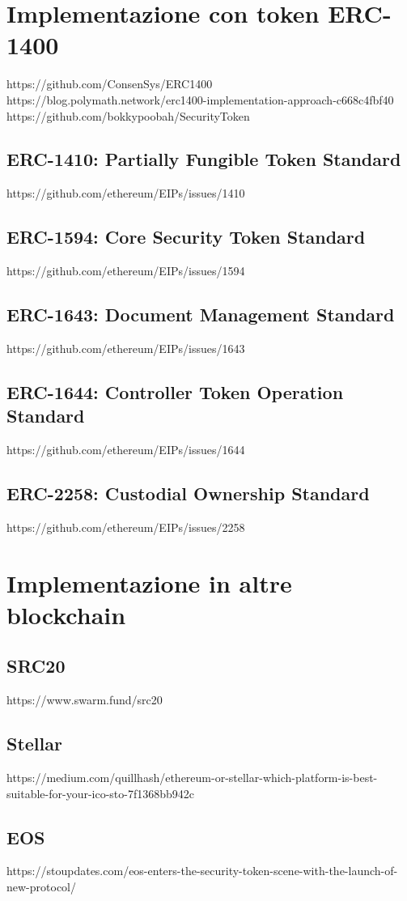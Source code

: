 \section{Implementazione con token ERC-1400}
https://github.com/ConsenSys/ERC1400
https://blog.polymath.network/erc1400-implementation-approach-c668c4fbf40
https://github.com/bokkypoobah/SecurityToken
\subsection{ERC-1410: Partially Fungible Token Standard}
https://github.com/ethereum/EIPs/issues/1410
\subsection{ERC-1594: Core Security Token Standard}
https://github.com/ethereum/EIPs/issues/1594
\subsection{ERC-1643: Document Management Standard}
https://github.com/ethereum/EIPs/issues/1643
\subsection{ERC-1644: Controller Token Operation Standard}
https://github.com/ethereum/EIPs/issues/1644
\subsection{ERC-2258: Custodial Ownership Standard}
https://github.com/ethereum/EIPs/issues/2258
\section{Implementazione in altre blockchain}
\subsection{SRC20}
https://www.swarm.fund/src20
\subsection{Stellar}
https://medium.com/quillhash/ethereum-or-stellar-which-platform-is-best-suitable-for-your-ico-sto-7f1368bb942c
\subsection{EOS}
https://stoupdates.com/eos-enters-the-security-token-scene-with-the-launch-of-new-protocol/
